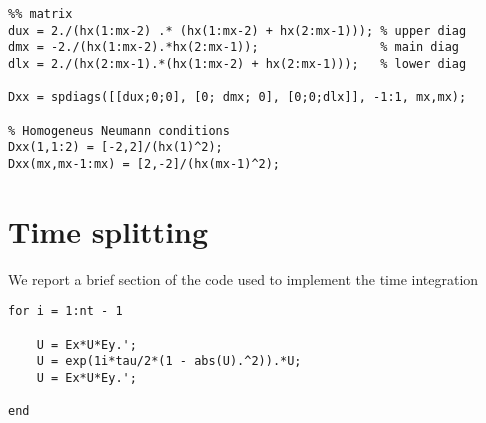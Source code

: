 \begin{lstlisting}
%% matrix
dux = 2./(hx(1:mx-2) .* (hx(1:mx-2) + hx(2:mx-1))); % upper diag 
dmx = -2./(hx(1:mx-2).*hx(2:mx-1));                 % main diag
dlx = 2./(hx(2:mx-1).*(hx(1:mx-2) + hx(2:mx-1)));   % lower diag

Dxx = spdiags([[dux;0;0], [0; dmx; 0], [0;0;dlx]], -1:1, mx,mx);

% Homogeneus Neumann conditions 
Dxx(1,1:2) = [-2,2]/(hx(1)^2);
Dxx(mx,mx-1:mx) = [2,-2]/(hx(mx-1)^2);
\end{lstlisting}

\section{Time splitting}

We report a brief section of the code used to implement the time integration

\begin{lstlisting}
for i = 1:nt - 1

    U = Ex*U*Ey.';
    U = exp(1i*tau/2*(1 - abs(U).^2)).*U;
    U = Ex*U*Ey.';
 
end
\end{lstlisting}